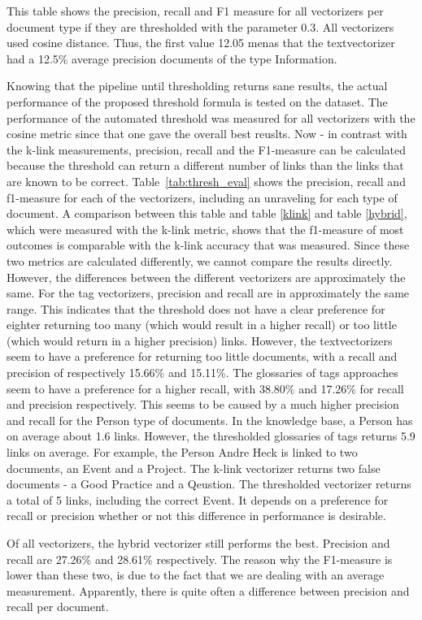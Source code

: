 \begin{table}
\caption{This table shows the precision, recall and F1 measure for all vectorizers per document type if they are thresholded with the parameter 0.3. All vectorizers used cosine distance. Thus, the first value 12.05 menas that the textvectorizer had a 12.5\% average precision documents of the type Information. }
\label{tab:thresh_eval}
\end{table}

Knowing that the pipeline until thresholding returns sane results, the actual performance
of the proposed threshold formula is tested on the dataset. The performance of the 
automated threshold was measured for all vectorizers with the cosine metric since that one gave the overall best reuslts. Now - in contrast with the k-link measurements, precision, recall and the F1-measure can be calculated because the threshold can return a different number of links than the links that are known to be correct. Table~\ref{tab:thresh_eval} 
shows the precision, recall and f1-measure for each of the vectorizers, including an unraveling for
each type of document. A comparison between this table and table \ref{klink} and table \ref{hybrid}, which were measured with the k-link metric, shows that the f1-measure of most outcomes is comparable with the k-link accuracy that was measured. Since these two metrics are calculated differently, we cannot compare the
results directly. However, the differences between the different vectorizers are approximately the same. For the tag vectorizers, precision and recall are in approximately the same range. This indicates that the threshold does not have a clear preference for eighter returning too many (which would result in a higher recall) or too little (which would return in a higher precision) links. However, the textvectorizers seem to have a preference for returning too little documents,  with a recall and precision of respectively 15.66\% and 15.11\%. The glossaries of tags approaches seem to have a preference for a higher recall, with 38.80\% and 17.26\% for recall and precision respectively. This seems to be caused by a much higher precision and recall for the Person type of documents. In the knowledge base, a Person has on average about 1.6 links. However, the thresholded glossaries of tags returns 5.9 links on average. For example, the Person Andre Heck is linked to two documents, an Event and a Project. The k-link vectorizer returns two false documents - a Good Practice and a Qeustion. The thresholded vectorizer returns a total of 5 links, including the correct Event. It depends on a preference for recall or precision whether or not this difference in performance is desirable. 

Of all vectorizers, the hybrid vectorizer still performs the best. Precision and recall are 27.26\% and 28.61\% respectively. The reason why the F1-measure is lower than these two, is due to the fact that we are dealing with an average measurement. Apparently, there is quite often a difference between precision and recall per document. 

\begin{table}

\end{table}
